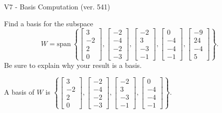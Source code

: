\begin{exercise}
  \begin{exerciseTitle}V7 - Basis Computation (ver. 541)\end{exerciseTitle}
  \begin{exerciseStatement}
    Find a basis for the subspace 
\[W=\mathrm{span}\ \left\{\left[\begin{array}{r}
3 \\
-2 \\
2 \\
0
\end{array}\right] , \left[\begin{array}{r}
-2 \\
-4 \\
-2 \\
-3
\end{array}\right] , \left[\begin{array}{r}
-2 \\
3 \\
-3 \\
-1
\end{array}\right] , \left[\begin{array}{r}
0 \\
-4 \\
-4 \\
-1
\end{array}\right] , \left[\begin{array}{r}
-9 \\
24 \\
-4 \\
5
\end{array}\right]\right\}.\]
 Be sure to explain why your result is a basis.


  \end{exerciseStatement}
  \begin{exerciseAnswer}
   A basis of \(W\) is  \(\left\{\left[\begin{array}{r}
3 \\
-2 \\
2 \\
0
\end{array}\right] , \left[\begin{array}{r}
-2 \\
-4 \\
-2 \\
-3
\end{array}\right] , \left[\begin{array}{r}
-2 \\
3 \\
-3 \\
-1
\end{array}\right] , \left[\begin{array}{r}
0 \\
-4 \\
-4 \\
-1
\end{array}\right]\right\}\).
  


  \end{exerciseAnswer}
\end{exercise}